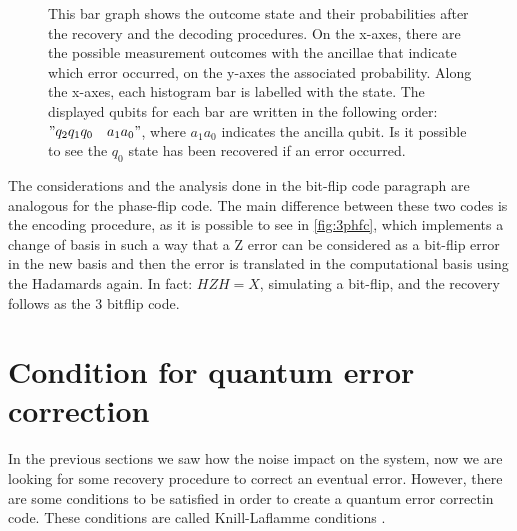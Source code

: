 \begin{figure}[h!]
\begin{minipage}[t]{0.6\textwidth}
\caption{This bar graph shows the outcome state and their probabilities after the recovery and the decoding procedures. On the x-axes, there are the possible measurement outcomes with the ancillae that indicate which error occurred, on the y-axes the associated probability. Along the x-axes, each histogram bar is labelled with the state. The displayed qubits for each bar are written in the following order: $"q_2 q_1 q_0 \quad a_1a_0"$, where $a_1 a_0$ indicates the ancilla qubit. Is it possible to see the $q_0$ state has been recovered if an error occurred.}
\label{fig:Seno900Hz}
\end{minipage}
\end{figure}

The considerations and the analysis done in the bit-flip code paragraph are analogous for the phase-flip code. The main difference between these two codes is the encoding procedure, as it is possible to see in \ref{fig:3phfc}, which implements a change of basis in such a way that a Z error can be considered as a bit-flip error in the new basis and then the error is translated in the computational basis using the Hadamards again. In fact: $HZH=X$, simulating a bit-flip, and the recovery follows as the 3 bitflip code. 







\section{Condition for quantum error correction}
In the previous sections we saw how the noise impact on the system, now we are looking for some recovery procedure to correct an eventual error. However, there are some conditions to be satisfied in order to create a quantum error correctin code. These conditions are called Knill-Laflamme conditions \cite{Knill_2000}.



